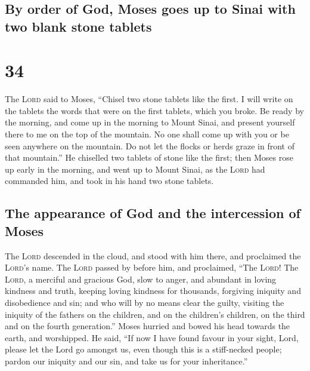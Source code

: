 \hypertarget{by-order-of-god-moses-goes-up-to-sinai-with-two-blank-stone-tablets}{%
\subsection{By order of God, Moses goes up to Sinai with two blank stone
tablets}\label{by-order-of-god-moses-goes-up-to-sinai-with-two-blank-stone-tablets}}

\hypertarget{section-33}{%
\section{34}\label{section-33}}

 The \textsc{Lord} said to Moses, ``Chisel two stone
tablets like the first. I will write on the tablets the words that were
on the first tablets, which you broke.  Be ready by the
morning, and come up in the morning to Mount Sinai, and present yourself
there to me on the top of the mountain.  No one shall come
up with you or be seen anywhere on the mountain. Do not let the flocks
or herds graze in front of that mountain.''  He chiselled
two tablets of stone like the first; then Moses rose up early in the
morning, and went up to Mount Sinai, as the \textsc{Lord} had commanded
him, and took in his hand two stone tablets.

\hypertarget{the-appearance-of-god-and-the-intercession-of-moses}{%
\subsection{The appearance of God and the intercession of
Moses}\label{the-appearance-of-god-and-the-intercession-of-moses}}

 The \textsc{Lord} descended in the cloud, and stood with
him there, and proclaimed the \textsc{Lord}'s name.  The
\textsc{Lord} passed by before him, and proclaimed, ``The \textsc{Lord}!
The \textsc{Lord}, a merciful and gracious God, slow to anger, and
abundant in loving kindness and truth,  keeping loving
kindness for thousands, forgiving iniquity and disobedience and sin; and
who will by no means clear the guilty, visiting the iniquity of the
fathers on the children, and on the children's children, on the third
and on the fourth generation.''  Moses hurried and bowed
his head towards the earth, and worshipped.  He said, ``If
now I have found favour in your sight, Lord, please let the Lord go
amongst us, even though this is a stiff-necked people; pardon our
iniquity and our sin, and take us for your inheritance.''


